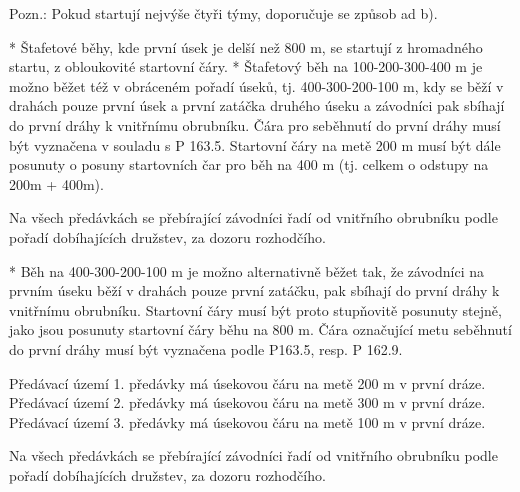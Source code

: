 Pozn.: Pokud startují nejvýše čtyři týmy, doporučuje se způsob ad b).

* Štafetové běhy, kde první úsek je delší než 800 m, se startují z hromadného startu, z obloukovité startovní čáry.
* Štafetový běh na 100-200-300-400 m je možno běžet též v obráceném pořadí úseků, tj. 400-300-200-100 m, kdy se běží v drahách pouze první úsek a první zatáčka druhého úseku a závodníci pak sbíhají do první dráhy k vnitřnímu obrubníku. Čára pro seběhnutí do první dráhy musí být vyznačena v souladu s P 163.5. Startovní čáry na metě 200 m musí být dále posunuty o posuny startovních čar pro běh na 400 m (tj. celkem o odstupy na 200m + 400m).

Na všech předávkách se přebírající závodníci řadí od vnitřního obrubníku podle pořadí dobíhajících družstev, za dozoru rozhodčího.

* Běh na 400-300-200-100 m je možno alternativně běžet tak, že závodníci na prvním úseku běží v drahách pouze první zatáčku, pak sbíhají do první dráhy k vnitřnímu obrubníku. Startovní čáry musí být proto stupňovitě posunuty stejně, jako jsou posunuty startovní čáry běhu na 800 m. Čára označující metu seběhnutí do první dráhy musí být vyznačena podle  P163.5, resp. P 162.9.

Předávací území 1. předávky má úsekovou čáru na metě 200 m v první dráze.
Předávací území 2. předávky má úsekovou čáru na metě 300 m v první dráze.
Předávací území 3. předávky má úsekovou čáru na metě 100 m v první dráze.

Na všech předávkách se přebírající závodníci řadí od vnitřního obrubníku podle pořadí dobíhajících družstev, za dozoru rozhodčího.
\enditems

\endinput